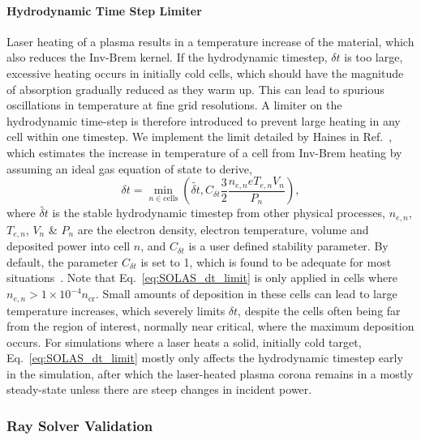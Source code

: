 \paragraph*{Hydrodynamic Time Step Limiter}
Laser heating of a plasma results in a temperature increase of the material, which also reduces the \ac{Inv-Brem} kernel.
If the hydrodynamic timestep, $\delta t$ is too large, excessive heating occurs in initially cold cells, which should have the magnitude of absorption gradually reduced as they warm up.
This can lead to spurious oscillations in temperature at fine grid resolutions.
A limiter on the hydrodynamic time-step is therefore introduced to prevent large heating in any cell within one timestep.
We implement the limit detailed by Haines in Ref.~\cite{haines_coupling_2020}, which estimates the increase in temperature of a cell from \ac{Inv-Brem} heating by assuming an ideal gas equation of state to derive,
\begin{equation}
    \label{eq:SOLAS_dt_limit}
    \delta t = \min_{n\in \text{cells}}{\left( \tilde{\delta t}, C_{\delta t} \frac{3}{2} \frac{n_{e,n} e T_{e,n} V_n }{P_n} \right)},
\end{equation}
where $\tilde{\delta t}$ is the stable hydrodynamic timestep from other physical processes, $n_{e,n}$, $T_{e,n}$, $V_n$ \& $P_n$ are the electron density, electron temperature, volume and deposited power into cell $n$, and $C_{\delta t}$ is a user defined stability parameter.
By default, the parameter $C_{\delta t}$ is set to 1, which is found to be adequate for most situations~\cite{haines_coupling_2020}.
Note that Eq.~\ref{eq:SOLAS_dt_limit} is only applied in cells where $n_{e,n}>1\times 10^{-4} n_{\text{cr}}$.
Small amounts of deposition in these cells can lead to large temperature increases, which severely limits $\delta t$, despite the cells often being far from the region of interest, normally near critical, where the maximum deposition occurs.
For simulations where a laser heats a solid, initially cold target, Eq.~\ref{eq:SOLAS_dt_limit} mostly only affects the hydrodynamic timestep early in the simulation, after which the laser-heated plasma corona remains in a mostly steady-state unless there are steep changes in incident power.

\subsubsection{Ray Solver Validation}%
\label{sec:SOLAS_ray_validation}

